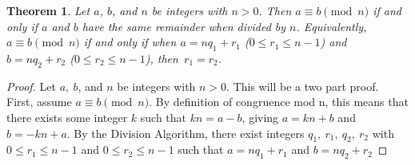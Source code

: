 \documentclass[12pt,leqno]{article}
\numberwithin{equation}{section}
\newtheorem{thm}{Theorem}[section]
\theoremstyle{definition}
\begin{document}
\pagebreak
\begin{thm}
Let $a$, $b$, and $n$ be integers with $n > 0$.  Then $a \equiv b
\pmod{n}$ if and only if $a$ and $b$ have the same remainder when
divided by $n$.  Equivalently, $a \equiv b \pmod{n}$ if and only if
when $a = nq_1 + r_1$ ($0 \leq r_1 \leq n-1$) and $b = nq_2 + r_2$
($0 \leq r_2 \leq n-1$), then~$r_1 = r_2$.
\end{thm}

\begin{proof}[Proof]
Let $a,\ b$, and $n$ be integers with $n > 0$.  This will be a two part proof.\\

First, assume $a \equiv b \pmod{n}$.  By definition of congruence mod n, this means that there exists some integer $k$ such that $kn = a-b$, giving $a = kn + b$ and $b = -kn + a$.  By the Division Algorithm, there exist integers $q_1,\ r_1,\ q_2,\ r_2$ with $0 \leq r_1 \leq n-1$ and $0 \leq r_2 \leq n-1$ such that $a = nq_1 + r_1$ and $b = nq_2 + r_2$
\end{proof}
\end{document}

